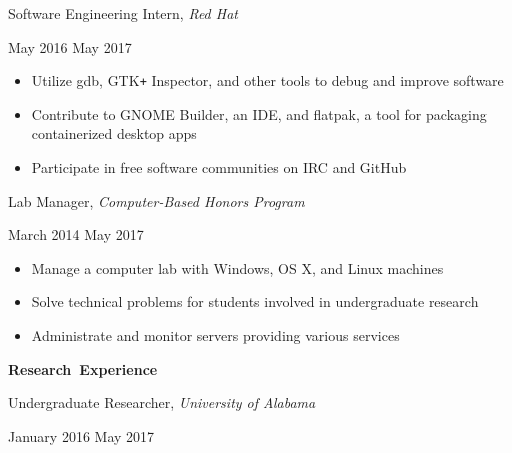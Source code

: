 \documentclass[11pt]{article}
\begin{document}
\begin{minipage}[t]{0.65\textwidth}
\flushleft
Software Engineering Intern, \textit{Red Hat}\\
\end{minipage}
\begin{minipage}[t]{0.30\textwidth}
\flushright
May 2016 \space \textemdash \space May 2017\\
\end{minipage}

\begin{itemize}
  \item Utilize gdb, GTK\texttt{+} Inspector, and other tools to debug and improve software
  \item Contribute to GNOME Builder, an IDE, and flatpak, a tool for packaging containerized desktop apps
  \item Participate in free software communities on IRC and GitHub
\end{itemize}

\begin{minipage}[t]{0.65\textwidth}
\flushleft
Lab Manager, \textit{Computer-Based Honors Program}\\
\end{minipage}
\begin{minipage}[t]{0.30\textwidth}
\flushright
March 2014 \space \textemdash \space May 2017\\
\end{minipage}

\begin{itemize}
  \item Manage a computer lab with Windows, OS X, and Linux machines
  \item Solve technical problems for students involved in undergraduate research
  \item Administrate and monitor servers providing various services
\end{itemize}

\vspace{0.8em}
\hbox{\large \textbf{Research Experience}}

\vspace{0.4em}
\begin{minipage}[t]{0.65\textwidth}
\flushleft
Undergraduate Researcher, \textit{University of Alabama}\\
\end{minipage}
\begin{minipage}[t]{0.30\textwidth}
\flushright
January 2016 \space \textemdash \space May 2017\\
\end{minipage}
\end{document}
